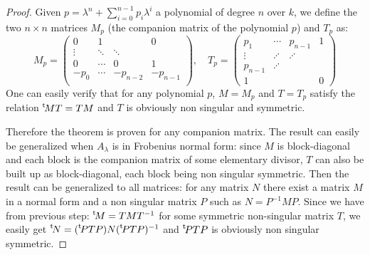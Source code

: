 \documentclass{article}%
\def\transpose#1{{\vphantom{#1}}^{\mathrm{t}}\!#1}
\begin{document}
\begin{proof}%
Given $p=\lambda^n+\sum_{i=0}^{n-1}{p_i\lambda^i}$ a polynomial of degree $n$ over $k$, we define the two 
$n\times n$ matrices $M_p$ (the companion matrix of the polynomial $p$) and $T_p$ as:
\begin{equation}
\label{eq:companion}
M_p = \begin{pmatrix}
0 & 1 & & 0\\
\vdots & \ddots & \ddots & \\
0 & \cdots & 0 & 1 \\
-p_0 & \cdots & -p_{n-2} & -p_{n-1}\\
%
\end{pmatrix}
, \quad T_p = \begin{pmatrix}
	p_1 & \cdots & p_{n-1} & 1 \\
	\vdots	& \iddots & \iddots & \\
	p_{n-1} & \iddots & & \\
	1 & & & 0
\end{pmatrix}
\end{equation}
One can easily verify that for any polynomial $p$, $M=M_p$ and $T=T_p$
satisfy the relation $\transpose{M}T = TM$ and $T$ is obviously non singular and symmetric.

Therefore the theorem is proven for any companion matrix. The result can
easily be generalized when $A_\lambda$ is in Frobenius normal form: since $M$ is block-diagonal and each block is the companion matrix of some elementary divisor, $T$ can also be built up as block-diagonal, each block being non singular symmetric. Then the result can be generalized to all matrices: for any matrix $N$ there exist a matrix $M$ in a normal form and a non singular matrix $P$ such as $N=P^{-1}MP$.  Since we have from previous step: $\transpose{M} = TMT^{-1}$ for some symmetric non-singular matrix $T$, we easily get $\transpose{N}=(\transpose{P}TP)N(\transpose{P}TP)^{-1}$ and $\transpose{P}TP$ is obviously non singular symmetric.
\end{proof}
% 
% 
\fi
\end{document}
